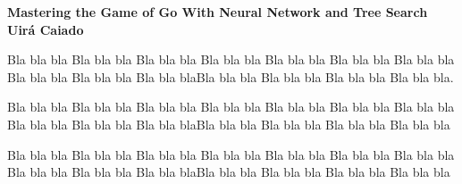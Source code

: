 \documentclass[a4paper]{article}
\begin{document}

\begin{center}

{\bf \large Mastering the Game of Go With Neural Network and Tree Search \\ \small Uirá Caiado}
\end{center}


Bla bla bla Bla bla bla Bla bla bla Bla bla bla Bla bla bla Bla bla bla Bla bla bla Bla bla bla Bla bla bla Bla bla blaBla bla bla Bla bla bla Bla bla bla Bla bla bla.

Bla bla bla Bla bla bla Bla bla bla Bla bla bla Bla bla bla Bla bla bla Bla bla bla Bla bla bla Bla bla bla Bla bla blaBla bla bla Bla bla bla Bla bla bla Bla bla bla

Bla bla bla Bla bla bla Bla bla bla Bla bla bla Bla bla bla Bla bla bla Bla bla bla Bla bla bla Bla bla bla Bla bla blaBla bla bla Bla bla bla Bla bla bla Bla bla bla \cite{Silver:2016hl}































\end{document}
